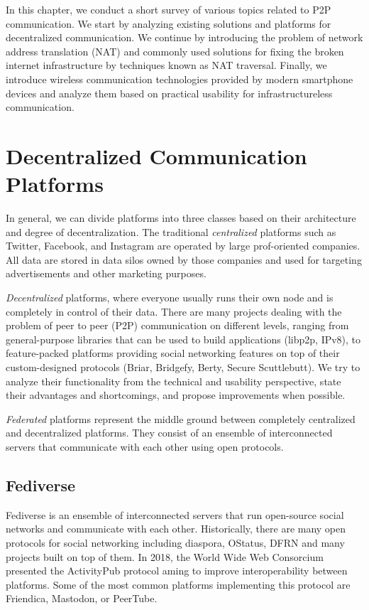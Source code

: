 
In this chapter, we conduct a short survey of various topics related to P2P communication. We start by analyzing existing solutions and platforms for decentralized communication. We continue by introducing the problem of network address translation (NAT) and commonly used solutions for fixing the broken internet infrastructure by techniques known as NAT traversal. Finally, we introduce wireless communication technologies provided by modern smartphone devices and analyze them based on practical usability for infrastructureless communication.

\section{Decentralized Communication Platforms}

In general, we can divide platforms into three classes based on their architecture and degree of decentralization. The traditional \textit{centralized} platforms such as Twitter, Facebook, and Instagram are operated by large prof-oriented companies. All data are stored in data silos owned by those companies and used for targeting advertisements and other marketing purposes.

\textit{Decentralized} platforms, where everyone usually runs their own node and is completely in control of their data. There are many projects dealing with the problem of peer to peer (P2P) communication on different levels, ranging from general-purpose libraries that can be used to build applications (libp2p, IPv8), to feature-packed platforms providing social networking features on top of their custom-designed protocols (Briar, Bridgefy, Berty, Secure Scuttlebutt). We try to analyze their functionality from the technical and usability perspective, state their advantages and shortcomings, and propose improvements when possible.

\textit{Federated} platforms represent the middle ground between completely centralized and decentralized platforms. They consist of an ensemble of interconnected servers that communicate with each other using open protocols.

\subsection{Fediverse}

Fediverse is an ensemble of interconnected servers that run open-source social networks and communicate with each other. Historically, there are many open protocols for social networking including diaspora, OStatus, DFRN and many projects built on top of them. In 2018, the World Wide Web Consorcium presented the ActivityPub protocol aming to improve interoperability between platforms. Some of the most common platforms implementing this protocol are Friendica, Mastodon, or PeerTube.

